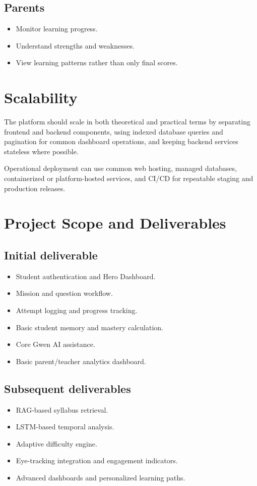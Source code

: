 \documentclass[11pt]{article}
\begin{document}
\subsection*{Parents}
\begin{itemize}
    \item Monitor learning progress.
    \item Understand strengths and weaknesses.
    \item View learning patterns rather than only final scores.
\end{itemize}

\section{Scalability}
The platform should scale in both theoretical and practical terms by separating frontend and backend components, using indexed database queries and pagination for common dashboard operations, and keeping backend services stateless where possible.

Operational deployment can use common web hosting, managed databases, containerized or platform-hosted services, and CI/CD for repeatable staging and production releases.

\section{Project Scope and Deliverables}
\subsection*{Initial deliverable}
\begin{itemize}
    \item Student authentication and Hero Dashboard.
    \item Mission and question workflow.
    \item Attempt logging and progress tracking.
    \item Basic student memory and mastery calculation.
    \item Core Gwen AI assistance.
    \item Basic parent/teacher analytics dashboard.
\end{itemize}

\subsection*{Subsequent deliverables}
\begin{itemize}
    \item RAG-based syllabus retrieval.
    \item LSTM-based temporal analysis.
    \item Adaptive difficulty engine.
    \item Eye-tracking integration and engagement indicators.
    \item Advanced dashboards and personalized learning paths.
\end{itemize}
\end{document}
